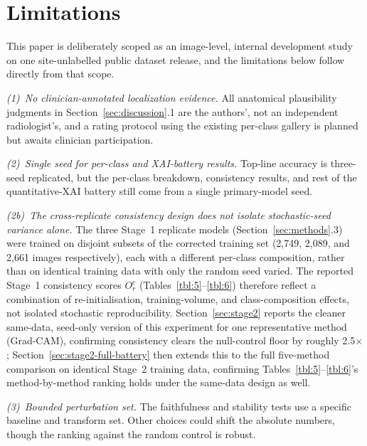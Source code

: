 \section{Limitations}
\label{sec:limitations}

This paper is deliberately scoped as an image-level, internal development study on one site-unlabelled public dataset release, and the limitations below follow directly from that scope.

\textit{(1)~No clinician-annotated localization evidence.} All anatomical plausibility judgments in Section~\ref{sec:discussion}.1 are the authors', not an independent radiologist's, and a rating protocol using the existing per-class gallery is planned but awaits clinician participation.

\textit{(2)~Single seed for per-class and XAI-battery results.} Top-line accuracy is three-seed replicated, but the per-class breakdown, consistency results, and rest of the quantitative-XAI battery still come from a single primary-model seed.

\textit{(2b)~The cross-replicate consistency design does not isolate stochastic-seed variance alone.} The three Stage~1 replicate models (Section~\ref{sec:methods}.3) were trained on disjoint subsets of the corrected training set (2,749, 2,089, and 2,661 images respectively), each with a different per-class composition, rather than on identical training data with only the random seed varied. The reported Stage~1 consistency scores $O_r^c$ (Tables~\ref{tbl:5}--\ref{tbl:6}) therefore reflect a combination of re-initialisation, training-volume, and class-composition effects, not isolated stochastic reproducibility. Section~\ref{sec:stage2} reports the cleaner same-data, seed-only version of this experiment for one representative method (Grad-CAM), confirming consistency clears the null-control floor by roughly 2.5$\times$; Section~\ref{sec:stage2-full-battery} then extends this to the full five-method comparison on identical Stage~2 training data, confirming Tables~\ref{tbl:5}--\ref{tbl:6}'s method-by-method ranking holds under the same-data design as well.

\textit{(3)~Bounded perturbation set.} The faithfulness and stability tests use a specific baseline and transform set. Other choices could shift the absolute numbers, though the ranking against the random control is robust.


